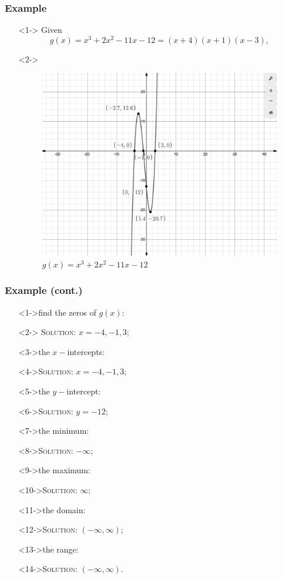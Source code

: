 \documentclass{beamer}
\begin{document}
\begin{frame}
	\frametitle{Example}
	\begin{enumerate}
		\item[]<1-> Given
		\[
			g(x)=x^{3}+2x^{2}-11x-12=(x+4)(x+1)(x-3),
		\]
		\item[]<2->
		\begin{figure}
			\begin{center}
				\caption{$g(x)=x^{3}+2x^{2}-11x-12$}
				\includegraphics[scale=0.2]{4_1_050.png}
			\end{center}
		\end{figure}
	\end{enumerate}
\end{frame}

\begin{frame}
	\frametitle{Example (cont.)}
		\begin{enumerate}
			\item[]<1->find the zeros of $g(x)$:
			\item[]<2-> \textsc{Solution:} $x=-4, -1, 3$;
			\item[]<3->the $x-$intercepts:
			\item[]<4->\textsc{Solution:} $x=-4, -1, 3$;
			\item[]<5->the $y-$intercept:
			\item[]<6->\textsc{Solution:} $y=-12$;
			\item[]<7->the minimum:
			\item[]<8->\textsc{Solution:} $-\infty$;
			\item[]<9->the maximum:
			\item[]<10->\textsc{Solution:} $\infty$;
			\item[]<11->the domain:
			\item[]<12->\textsc{Solution:} $(-\infty, \infty)$;
			\item[]<13->the range:
			\item[]<14->\textsc{Solution:} $(-\infty, \infty)$.
		\end{enumerate}
\end{frame}
\end{document}
